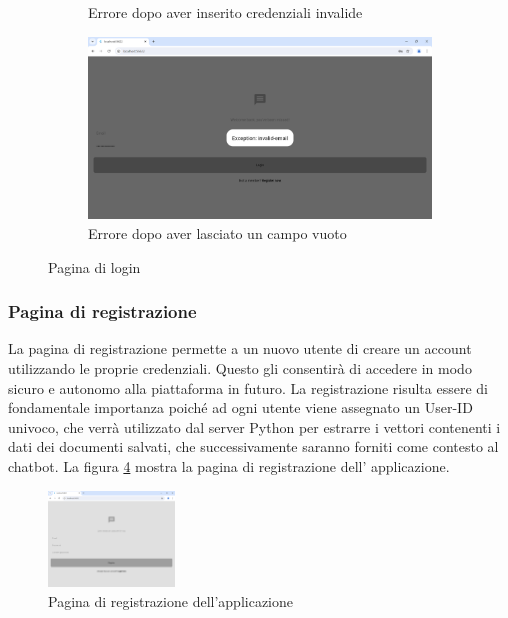 \begin{figure}[H]
\begin{subfigure}{.5\textwidth}
		\caption{Errore dopo aver inserito credenziali invalide\newline}
		\label{fig:invalid_credentials}
	\end{subfigure}%
        \begin{subfigure}{.5\textwidth}
		\centering
		\includegraphics[width=0.45\linewidth]{Immagini/login_page_empty_field.png}
		\caption{Errore dopo aver lasciato un campo vuoto\newline}
		\label{fig:empty_field}
	\end{subfigure}%
	\caption{Pagina di login}
\end{figure}

\subsubsection{Pagina di registrazione}
La pagina di registrazione permette a un nuovo utente di creare un account utilizzando le proprie credenziali. Questo gli consentirà di accedere in modo sicuro e autonomo alla piattaforma in futuro. La registrazione risulta essere di fondamentale importanza poiché ad ogni utente viene assegnato un User-ID univoco, che verrà utilizzato dal server Python per estrarre i vettori contenenti i dati dei documenti salvati, che successivamente saranno forniti come contesto al chatbot. La figura \ref{fig:register_page} mostra la pagina di registrazione dell' applicazione.
\begin{figure}[ht]
	\centering
	\includegraphics[width=0.3\textwidth]{Immagini/register_page.png}
	\caption{Pagina di registrazione dell'applicazione}
	\label{fig:register_page}
\end{figure}

